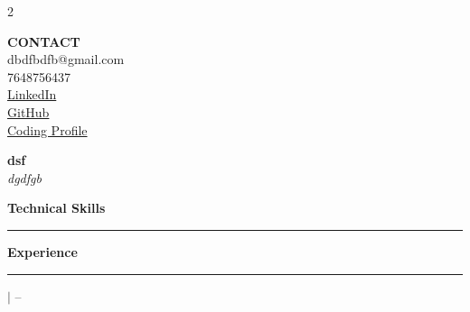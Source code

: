 \documentclass[10pt, letterpaper]{article}
\begin{document}
\pagestyle{empty}

\begin{paracol}{2}
    \begin{leftcolumn}
        \vspace{10mm} 
        \begin{flushleft}
            {\large \textbf{\color{accentColor}CONTACT}} \\
            \small dbdfbdfb@gmail.com \\
            \small 7648756437 \\             \small \href{linkedin.com/in/alexrivera-dev}{LinkedIn} \\             \small \href{hgfuyr.rgjrh}{GitHub} \\             \small \href{egfuegyf.rjgfhr}{Coding Profile} \\             
            \vspace{10mm}

                    \end{flushleft}
    \end{leftcolumn}

    \begin{rightcolumn}
        \vspace{2mm} 
        {\Huge \textbf{\color{accentColor}dsf}} \\
        {\large \textit{dgdfgb}}
        
        \vspace{8mm} 
        
        {\Large \textbf{Technical Skills}}
        \vspace{1mm}
        {\color{lineColor}\hrule}
        \vspace{3mm}
        {\small }
        
                    \vspace{8mm} 
            \needspace{6cm} 
            {\Large \textbf{Experience}}
            \vspace{1mm}
            {\color{lineColor}\hrule}
            \vspace{4mm}
            
                            \begin{minipage}[t]{\linewidth}
                    \noindent \textbf{} $|$  \hfill \small  --  \\
                    \textit{\small } \\
                    \vspace{1mm} 
                    {\small \begin{itemize}  \end{itemize}} 
                    \vspace{4mm} 
                \end{minipage}
                            

\end{rightcolumn}
\end{paracol}
\end{document}
